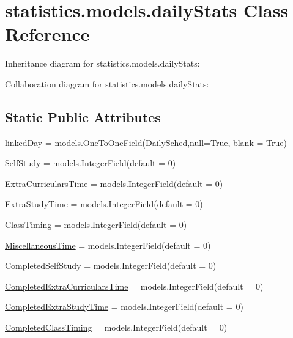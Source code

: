 \hypertarget{classstatistics_1_1models_1_1dailyStats}{}\section{statistics.\+models.\+daily\+Stats Class Reference}
\label{classstatistics_1_1models_1_1dailyStats}


Inheritance diagram for statistics.\+models.\+daily\+Stats\+:


Collaboration diagram for statistics.\+models.\+daily\+Stats\+:
\subsection*{Static Public Attributes}
\begin{DoxyCompactItemize}
\item 
\hyperlink{classstatistics_1_1models_1_1dailyStats_a519ea849b6f94b94f4ed187aeda701be}{linked\+Day} = models.\+One\+To\+One\+Field(\hyperlink{classTimetable_1_1models_1_1DailySched}{Daily\+Sched},null=True, blank = True)
\item 
\hyperlink{classstatistics_1_1models_1_1dailyStats_a45fb03a98db2062537d449f60e9f8f71}{Self\+Study} = models.\+Integer\+Field(default = 0)
\item 
\hyperlink{classstatistics_1_1models_1_1dailyStats_ac074f31070d3dae16f586e786d85b1f3}{Extra\+Curriculars\+Time} = models.\+Integer\+Field(default = 0)
\item 
\hyperlink{classstatistics_1_1models_1_1dailyStats_aeb884bf88e957e71ca2ac54417f7cc5d}{Extra\+Study\+Time} = models.\+Integer\+Field(default = 0)
\item 
\hyperlink{classstatistics_1_1models_1_1dailyStats_a64c0a84cafb1e53a56946262d600511d}{Class\+Timing} = models.\+Integer\+Field(default = 0)
\item 
\hyperlink{classstatistics_1_1models_1_1dailyStats_af0edffeea33ea7e79d3a5702798a4478}{Miscellaneous\+Time} = models.\+Integer\+Field(default = 0)
\item 
\hyperlink{classstatistics_1_1models_1_1dailyStats_adf62cf0f094acc048701d98eb14f6938}{Completed\+Self\+Study} = models.\+Integer\+Field(default = 0)
\item 
\hyperlink{classstatistics_1_1models_1_1dailyStats_ab7ad94ef8eb2a008adb76100913589a1}{Completed\+Extra\+Curriculars\+Time} = models.\+Integer\+Field(default = 0)
\item 
\hyperlink{classstatistics_1_1models_1_1dailyStats_a23a0e94939fc27b3bc62d0fab69de8f1}{Completed\+Extra\+Study\+Time} = models.\+Integer\+Field(default = 0)
\item 
\hyperlink{classstatistics_1_1models_1_1dailyStats_ad2d911354275cd7317d8e8a679cbffba}{Completed\+Class\+Timing} = models.\+Integer\+Field(default = 0)
\end{DoxyCompactItemize}


